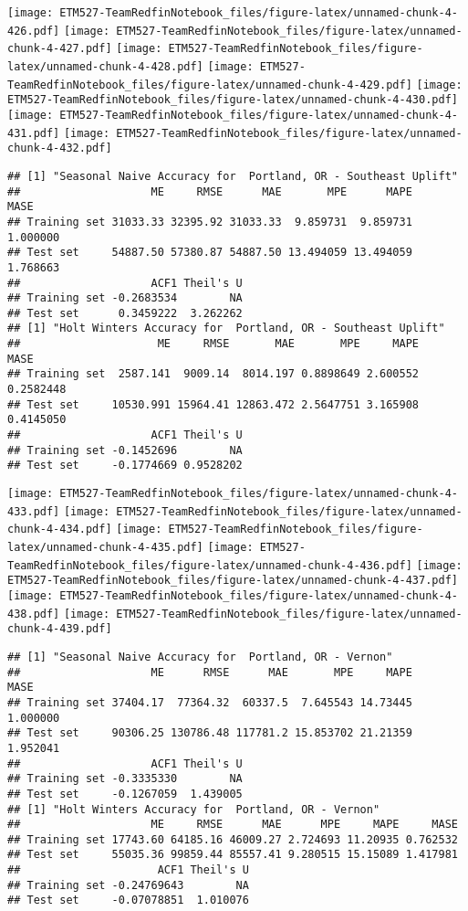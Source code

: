 \documentclass[]{article}
\begin{document}
\texttt{[image: ETM527-TeamRedfinNotebook\_files/figure-latex/unnamed-chunk-4-426.pdf]}
\texttt{[image: ETM527-TeamRedfinNotebook\_files/figure-latex/unnamed-chunk-4-427.pdf]}
\texttt{[image: ETM527-TeamRedfinNotebook\_files/figure-latex/unnamed-chunk-4-428.pdf]}
\texttt{[image: ETM527-TeamRedfinNotebook\_files/figure-latex/unnamed-chunk-4-429.pdf]}
\texttt{[image: ETM527-TeamRedfinNotebook\_files/figure-latex/unnamed-chunk-4-430.pdf]}
\texttt{[image: ETM527-TeamRedfinNotebook\_files/figure-latex/unnamed-chunk-4-431.pdf]}
\texttt{[image: ETM527-TeamRedfinNotebook\_files/figure-latex/unnamed-chunk-4-432.pdf]}

\begin{verbatim}
## [1] "Seasonal Naive Accuracy for  Portland, OR - Southeast Uplift"
##                    ME     RMSE      MAE       MPE      MAPE     MASE
## Training set 31033.33 32395.92 31033.33  9.859731  9.859731 1.000000
## Test set     54887.50 57380.87 54887.50 13.494059 13.494059 1.768663
##                    ACF1 Theil's U
## Training set -0.2683534        NA
## Test set      0.3459222  3.262262
## [1] "Holt Winters Accuracy for  Portland, OR - Southeast Uplift"
##                     ME     RMSE       MAE       MPE     MAPE      MASE
## Training set  2587.141  9009.14  8014.197 0.8898649 2.600552 0.2582448
## Test set     10530.991 15964.41 12863.472 2.5647751 3.165908 0.4145050
##                    ACF1 Theil's U
## Training set -0.1452696        NA
## Test set     -0.1774669 0.9528202
\end{verbatim}

\texttt{[image: ETM527-TeamRedfinNotebook\_files/figure-latex/unnamed-chunk-4-433.pdf]}
\texttt{[image: ETM527-TeamRedfinNotebook\_files/figure-latex/unnamed-chunk-4-434.pdf]}
\texttt{[image: ETM527-TeamRedfinNotebook\_files/figure-latex/unnamed-chunk-4-435.pdf]}
\texttt{[image: ETM527-TeamRedfinNotebook\_files/figure-latex/unnamed-chunk-4-436.pdf]}
\texttt{[image: ETM527-TeamRedfinNotebook\_files/figure-latex/unnamed-chunk-4-437.pdf]}
\texttt{[image: ETM527-TeamRedfinNotebook\_files/figure-latex/unnamed-chunk-4-438.pdf]}
\texttt{[image: ETM527-TeamRedfinNotebook\_files/figure-latex/unnamed-chunk-4-439.pdf]}

\begin{verbatim}
## [1] "Seasonal Naive Accuracy for  Portland, OR - Vernon"
##                    ME      RMSE      MAE       MPE     MAPE     MASE
## Training set 37404.17  77364.32  60337.5  7.645543 14.73445 1.000000
## Test set     90306.25 130786.48 117781.2 15.853702 21.21359 1.952041
##                    ACF1 Theil's U
## Training set -0.3335330        NA
## Test set     -0.1267059  1.439005
## [1] "Holt Winters Accuracy for  Portland, OR - Vernon"
##                    ME     RMSE      MAE      MPE     MAPE     MASE
## Training set 17743.60 64185.16 46009.27 2.724693 11.20935 0.762532
## Test set     55035.36 99859.44 85557.41 9.280515 15.15089 1.417981
##                     ACF1 Theil's U
## Training set -0.24769643        NA
## Test set     -0.07078851  1.010076
\end{verbatim}
\end{document}
